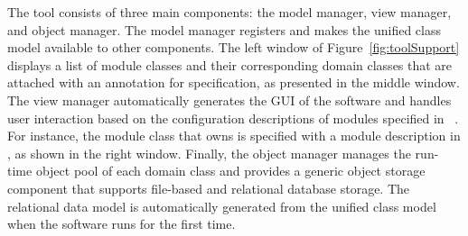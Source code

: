 The tool consists of three main components: the model manager, view manager, and object manager. The model manager registers and makes the unified class model available to other components. The left window of Figure~\ref{fig:toolSupport} displays a list of module classes and their corresponding domain classes that are attached with an annotation  for \agl specification, as presented in the middle window. The view manager automatically generates the GUI of the software and handles user interaction based on the configuration descriptions of modules specified in \mccl~\cite{le_domain_2018}. For instance, the module class  that owns  is specified with a module description in \mccl, as shown in the right window. Finally, the object manager manages the run-time object pool of each domain class and provides a generic object storage component that supports file-based and relational database storage. The relational data model is automatically generated from the unified class model when the software runs for the first time.

